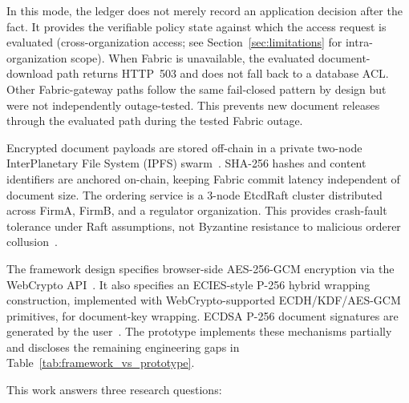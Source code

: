 \documentclass{ieeeaccess}
\begin{document}
In this mode, the ledger does not merely record an application decision after
the fact. It provides the verifiable policy state against which the access
request is evaluated (cross-organization access; see
Section~\ref{sec:limitations} for intra-organization scope). When Fabric is
unavailable, the evaluated document-download path returns HTTP~503 and does
not fall back to a database ACL. Other Fabric-gateway paths follow the same
fail-closed pattern by design but were not independently outage-tested. This
prevents new document releases through the evaluated path during the tested
Fabric outage.

Encrypted document payloads are stored off-chain in a private two-node
InterPlanetary File System (IPFS) swarm~\cite{benet2014ipfs}. SHA-256 hashes
and content identifiers are anchored on-chain, keeping Fabric commit latency
independent of document size. The ordering service is a 3-node EtcdRaft
cluster distributed across FirmA, FirmB, and a regulator organization. This
provides crash-fault tolerance under Raft assumptions, not Byzantine
resistance to malicious orderer collusion~\cite{hyperledgerFabricOrderingService_v24,Ongaro2014}.

The framework design specifies browser-side AES-256-GCM encryption via the
WebCrypto API~\cite{fips197,w3cWebCrypto}. It also specifies an ECIES-style
P-256 hybrid wrapping construction, implemented with WebCrypto-supported
ECDH/KDF/AES-GCM primitives, for document-key wrapping. ECDSA P-256 document
signatures are generated by the user~\cite{fips1865}. The prototype implements
these mechanisms partially and discloses the remaining engineering gaps in
Table~\ref{tab:framework_vs_prototype}.

This work answers three research questions:
\end{document}
